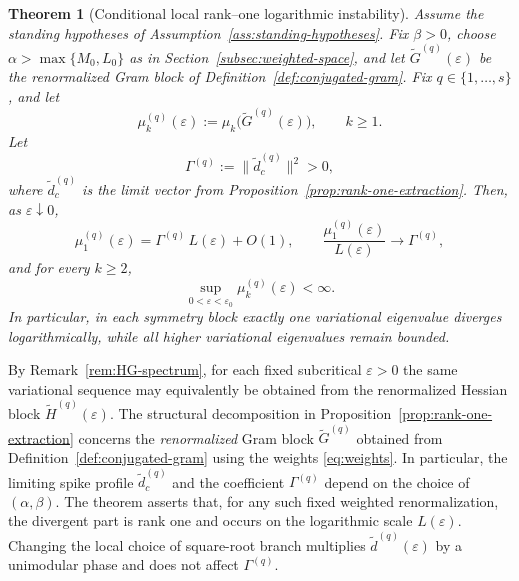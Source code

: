 \documentclass[11pt]{amsart}
\numberwithin{equation}{section}
\theoremstyle{plain}
\newtheorem{theorem}{Theorem}[section]
\theoremstyle{definition}
\theoremstyle{remark}
\begin{document}
\begin{theorem}[Conditional local rank--one logarithmic instability]
	\label{thm:universality}
	Assume the standing hypotheses of
	Assumption~\ref{ass:standing-hypotheses}. Fix \(\beta>0\), choose
	\(\alpha>\max\{M_0,L_0\}\) as in
	Section~\ref{subsec:weighted-space}, and let
	\(\widetilde G^{(q)}(\varepsilon)\) be the renormalized Gram block of
	Definition~\ref{def:conjugated-gram}. Fix
	$q\in\{1,\dots,s\}$, and let
	\[
		\mu_k^{(q)}(\varepsilon):=\mu_k\bigl(\widetilde G^{(q)}(\varepsilon)\bigr),
		\qquad k\ge1.
	\]
	Let
	\[
		\Gamma^{(q)}:=\|\widetilde d_c^{(q)}\|^2>0,
	\]
	where \(\widetilde d_c^{(q)}\) is the limit vector from
	Proposition~\ref{prop:rank-one-extraction}. Then, as
	\(\varepsilon\downarrow0\),
	\begin{equation}\label{eq:mu-sing}
		\mu^{(q)}_1(\varepsilon)
		=
		\Gamma^{(q)}\,L(\varepsilon)+O(1),
		\qquad
		\frac{\mu^{(q)}_1(\varepsilon)}{L(\varepsilon)}
		\longrightarrow \Gamma^{(q)},
	\end{equation}
	and for every \(k\ge2\),
	\[
	\sup_{0<\varepsilon<\varepsilon_0}\mu_k^{(q)}(\varepsilon)<\infty.
	\]
	In particular, in each symmetry block exactly one variational eigenvalue
	diverges logarithmically, while all higher variational eigenvalues remain
	bounded.
\end{theorem}

	By Remark~\ref{rem:HG-spectrum}, for each fixed subcritical
	\(\varepsilon>0\) the same variational sequence may equivalently be
	obtained from the renormalized Hessian block
	\(\widetilde H^{(q)}(\varepsilon)\). The structural decomposition in
	Proposition~\ref{prop:rank-one-extraction} concerns the \emph{renormalized}
	Gram block \(\widetilde G^{(q)}\) obtained from
	Definition~\ref{def:conjugated-gram} using the weights
	\eqref{eq:weights}. In particular, the limiting spike profile
	\(\widetilde d_c^{(q)}\) and the coefficient \(\Gamma^{(q)}\) depend on
	the choice of \((\alpha,\beta)\). The theorem asserts that, for any such
	fixed weighted renormalization, the divergent part is rank one and occurs
	on the logarithmic scale \(L(\varepsilon)\). Changing the local choice of
	square-root branch multiplies \(\widetilde d^{(q)}(\varepsilon)\) by
	a unimodular phase and does not affect \(\Gamma^{(q)}\).
\end{document}
